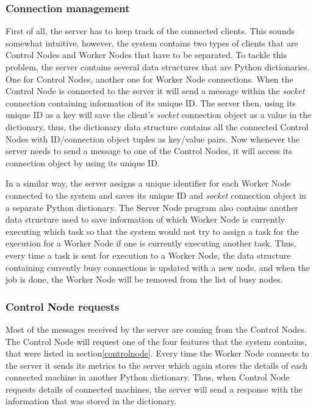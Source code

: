\documentclass[10pt]{report}
\begin{document}
\subsubsection{Connection management}

First of all, the server has to keep track of the connected clients. This sounds somewhat intuitive, however, the system contains two types of clients that are Control Nodes and Worker Nodes that have to be separated. To tackle this problem, the server contains several data structures that are Python dictionaries. One for Control Nodes, another one for Worker Node connections. When the Control Node is connected to the server it will send a message within the \textit{socket} connection containing information of its unique ID. The server then, using its unique ID as a key will save the client's \textit{socket} connection object as a value in the dictionary, thus, the dictionary data structure contains all the connected Control Nodes with ID/connection object tuples as key/value pairs. Now whenever the server needs to send a message to one of the Control Nodes, it will access its connection object by using its unique ID.
\newline

In a similar way, the server assigns a unique identifier for each Worker Node connected to the system and saves its unique ID and \textit{socket} connection object in a separate Python dictionary. The Server Node program also contains another data structure used to save information of which Worker Node is currently executing which task so that the system would not try to assign a task for the execution for a Worker Node if one is currently executing another task. Thus, every time a task is sent for execution to a Worker Node, the data structure containing currently busy connections is updated with a new node, and when the job is done, the Worker Node will be removed from the list of busy nodes.

\subsubsection{Control Node requests}

Most of the messages received by the server are coming from the Control Nodes. The Control Node will request one of the four features that the system contains, that were listed in section\ref{controlnode}. Every time the Worker Node connects to the server it sends its metrics to the server which again stores the details of each connected machine in another Python dictionary. Thus, when Control Node requests details of connected machines, the server will send a response with the information that was stored in the dictionary.
\newline
\end{document}
